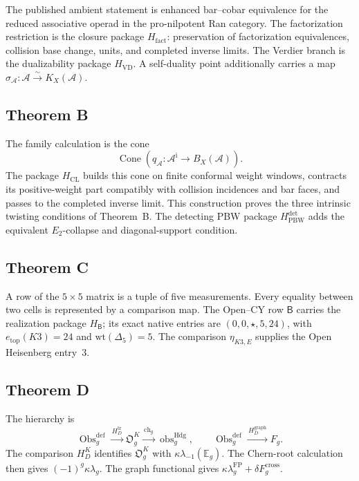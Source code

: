 \documentclass[11pt]{article}
\theoremstyle{plain}
\theoremstyle{definition}
\theoremstyle{remark}
\newcommand{\cA}{\mathcal{A}}
\begin{document}
The published ambient statement is enhanced bar--cobar equivalence
for the reduced associative operad in the pro-nilpotent Ran category.
The factorization restriction is the closure package
\(H_{\mathrm{fact}}\): preservation of factorization equivalences,
collision base change, units, and completed inverse limits.
The Verdier branch is the dualizability package
\(H_{\mathrm{VD}}\).  A self-duality point additionally carries a
map \(\sigma_\cA\colon\cA\xrightarrow{\sim}K_X(\cA)\).

\subsection*{Theorem B}

The family calculation is the cone
\[
 \operatorname{Cone}\!\left(
 q_\cA\colon\cA^{\mathrm i}\longrightarrow B_X(\cA)
 \right).
\]
The package \(H_{\mathrm{CL}}\) builds this cone on finite conformal
weight windows, contracts its positive-weight part compatibly with
collision incidences and bar faces, and passes to the completed
inverse limit.  This construction proves the three intrinsic
twisting conditions of Theorem~B.  The detecting PBW package
\(H_{\mathrm{PBW}}^{\mathrm{det}}\) adds the equivalent $E_2$-collapse
and diagonal-support condition.

\subsection*{Theorem C}

A row of the \(5\times5\) matrix is a tuple of five measurements.
Every equality between two cells is represented by a comparison map.
The Open--CY row \(\mathsf B\) carries the realization package
\(H_{\mathsf B}\); its exact native entries are
\((0,0,\star,5,24)\), with
\(e_{\mathrm{top}}(K3)=24\) and \(\mathrm{wt}(\Delta_5)=5\).
The comparison \(\eta_{K3,E}\) supplies the Open Heisenberg entry~$3$.

\subsection*{Theorem D}

The hierarchy is
\[
 \operatorname{Obs}^{\mathrm{def}}_g
 \xrightarrow{\,H_D^{\mathrm{tr}}\,}
 \mathfrak O_g^K
 \xrightarrow{\,\operatorname{ch}_g\,}
 \operatorname{obs}^{\mathrm{Hdg}}_g,
 \qquad
 \operatorname{Obs}^{\mathrm{def}}_g
 \xrightarrow{\,H_D^{\mathrm{graph}}\,}
 F_g.
\]
The comparison \(H_D^K\) identifies
\(\mathfrak O_g^K\) with
\(\kappa\lambda_{-1}(\mathbb E_g)\).
The Chern-root calculation then gives
\((-1)^g\kappa\lambda_g\).  The graph functional gives
\(\kappa\lambda_g^{\mathrm{FP}}+\delta F_g^{\mathrm{cross}}\).
\end{document}
